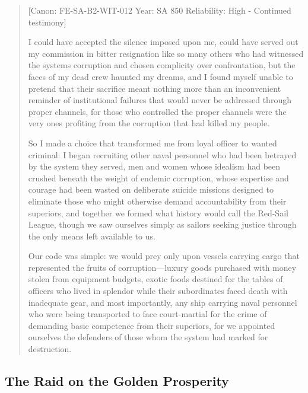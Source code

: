 \begin{quote}
{[}Canon: FE-SA-B2-WIT-012 \textbar{} Year: SA 850 \textbar{}
Reliability: High - Continued testimony{]}

I could have accepted the silence imposed upon me, could have served out
my commission in bitter resignation like so many others who had
witnessed the system\textquotesingle s corruption and chosen complicity
over confrontation, but the faces of my dead crew haunted my dreams, and
I found myself unable to pretend that their sacrifice meant nothing more
than an inconvenient reminder of institutional failures that would never
be addressed through proper channels, for those who controlled the
proper channels were the very ones profiting from the corruption that
had killed my people.

So I made a choice that transformed me from loyal officer to wanted
criminal: I began recruiting other naval personnel who had been betrayed
by the system they served, men and women whose idealism had been crushed
beneath the weight of endemic corruption, whose expertise and courage
had been wasted on deliberate suicide missions designed to eliminate
those who might otherwise demand accountability from their superiors,
and together we formed what history would call the Red-Sail League,
though we saw ourselves simply as sailors seeking justice through the
only means left available to us.

Our code was simple: we would prey only upon vessels carrying cargo that
represented the fruits of corruption---luxury goods purchased with money
stolen from equipment budgets, exotic foods destined for the tables of
officers who lived in splendor while their subordinates faced death with
inadequate gear, and most importantly, any ship carrying naval personnel
who were being transported to face court-martial for the crime of
demanding basic competence from their superiors, for we appointed
ourselves the defenders of those whom the system had marked for
destruction.
\end{quote}

\subsection{\texorpdfstring{The Raid on the \textbf{Golden
Prosperity}}{The Raid on the Golden Prosperity}}\label{the-raid-on-the-golden-prosperity}

